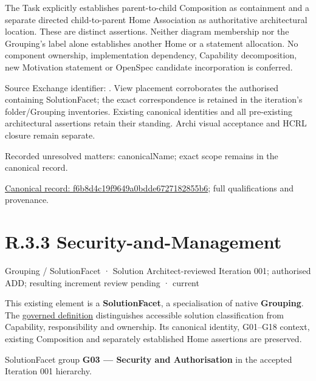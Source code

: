 The Task explicitly establishes parent-to-child Composition as containment and
a separate directed child-to-parent Home Association as authoritative architectural
location. These are distinct assertions. Neither diagram membership nor the
Grouping's label alone establishes another Home or a statement allocation.
No component ownership, implementation dependency, Capability decomposition,
new Motivation statement or OpenSpec candidate incorporation is conferred.



Source Exchange identifier: \texttt{}. View placement corroborates
the authorised containing SolutionFacet; the exact correspondence is retained in the
iteration's folder/Grouping inventories. Existing canonical identities and all
pre-existing architectural assertions retain their standing. Archi visual
acceptance and HCRL closure remain separate.


{\small Recorded unresolved matters: canonicalName; exact scope remains in the canonical record.}\par
{\footnotesize \href{../../../../../../../continuum/grouping/f6b8d4c19f9649a0bdde6727182855b6.md}{Canonical record: f6b8d4c19f9649a0bdde6727182855b6}; full qualifications and provenance.}\par
\section*{R.3.3 Security-and-Management}
\label{navigation:R.3.3}

\label{element:a762424d13254eaa9467946d9d7355f8}
{\small Grouping / SolutionFacet · Solution Architect-reviewed Iteration 001; authorised ADD; resulting increment review pending · current}\par

This existing element is a \textbf{SolutionFacet}, a specialisation of native
\textbf{Grouping}. The \href{\detokenize{../../../../../../../governance/continuum-representation.md#solutionfacet-classification--1119-candidate}}{governed definition}
distinguishes accessible solution classification from Capability, responsibility
and ownership. Its canonical identity, G01–G18 context, existing Composition
and separately established Home assertions are preserved.



SolutionFacet group \textbf{G03 — Security and Authorisation} in the accepted Iteration 001 hierarchy.



